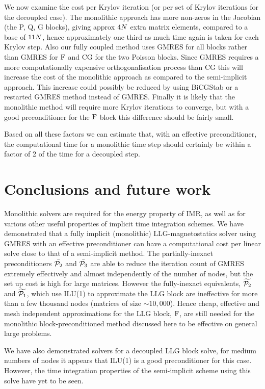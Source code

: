 We now examine the cost per Krylov iteration (or per set of Krylov iterations for the decoupled case).
The monolithic approach has more non-zeros in the Jacobian (the P, Q, G blocks), giving approx $4 N$ extra matrix elements, compared to a base of $11 N$, hence approximately one third as much time again is taken for each Krylov step.
Also our fully coupled method uses GMRES for all blocks rather than GMRES for $\mathrm{F}$ and CG for the two Poisson blocks.
Since GMRES requires a more computationally expensive orthogonalisation process than CG this will increase the cost of the monolithic approach as compared to the semi-implicit approach.
This increase could possibly be reduced by using BiCGStab or a restarted GMRES method instead of GMRES.
Finally it is likely that the monolithic method will require more Krylov iterations to converge, but with a good preconditioner for the $\mathrm{F}$ block this difference should be fairly small.

Based on all these factors we can estimate that, with an effective preconditioner, the computational time for a monolithic time step should certainly be within a factor of 2 of the time for a decoupled step.


\section{Conclusions and future work}

Monolithic solvers are required for the energy property of IMR, as well as for various other useful properties of implicit time integration schemes.
We have demonstrated that a fully implicit (monolithic) LLG-magnetostatics solver using GMRES with an effective preconditioner can have a computational cost per linear solve close to that of a semi-implicit method.
The partially-inexact preconditioners $\bar{\mathcal{P}_2}$ and $\bar{\mathcal{P}_3}$ are able to reduce the iteration count of GMRES extremely effectively and almost independently of the number of nodes, but the set up cost is high for large matrices.
However the fully-inexact equivalents, $\widetilde{\mathcal{P}_2}$ and  $\widetilde{\mathcal{P}_1}$, which use ILU(1) to approximate the LLG block are ineffective for more than a few thousand nodes (\ie matrices of size $\sim 10,000$).
Hence cheap, effective and mesh independent approximations for the LLG block, $\mathrm{F}$, are still needed for the monolithic block-preconditioned method discussed here to be effective on general large problems.

We have also demonstrated solvers for a decoupled LLG block solve, for medium numbers of nodes it appears that ILU(1) is a good preconditioner for this case.
However, the time integration properties of the semi-implicit scheme using this solve have yet to be seen.


